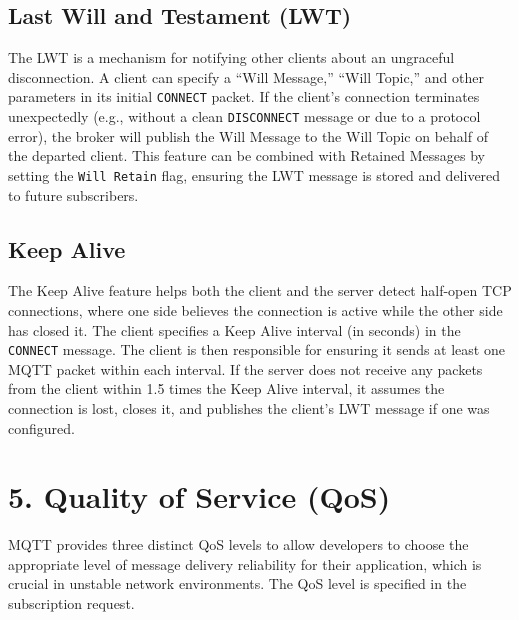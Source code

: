 \documentclass[a4paper, 12pt]{book} %
\begin{document}
\subsection{Last Will and Testament
(LWT)}\label{last-will-and-testament-lwt}

The LWT is a mechanism for notifying other clients about an ungraceful
disconnection. A client can specify a ``Will Message,'' ``Will Topic,''
and other parameters in its initial \texttt{CONNECT} packet. If the
client's connection terminates unexpectedly (e.g., without a clean
\texttt{DISCONNECT} message or due to a protocol error), the broker will
publish the Will Message to the Will Topic on behalf of the departed
client. This feature can be combined with Retained Messages by setting
the \texttt{Will\ Retain} flag, ensuring the LWT message is stored and
delivered to future subscribers.

\subsection{Keep Alive}\label{keep-alive}

The Keep Alive feature helps both the client and the server detect
half-open TCP connections, where one side believes the connection is
active while the other side has closed it. The client specifies a Keep
Alive interval (in seconds) in the \texttt{CONNECT} message. The client
is then responsible for ensuring it sends at least one MQTT packet
within each interval. If the server does not receive any packets from
the client within 1.5 times the Keep Alive interval, it assumes the
connection is lost, closes it, and publishes the client's LWT message if
one was configured.

\section{5. Quality of Service (QoS)}\label{quality-of-service-qos}

MQTT provides three distinct QoS levels to allow developers to choose
the appropriate level of message delivery reliability for their
application, which is crucial in unstable network environments. The QoS
level is specified in the subscription request.
\end{document}
